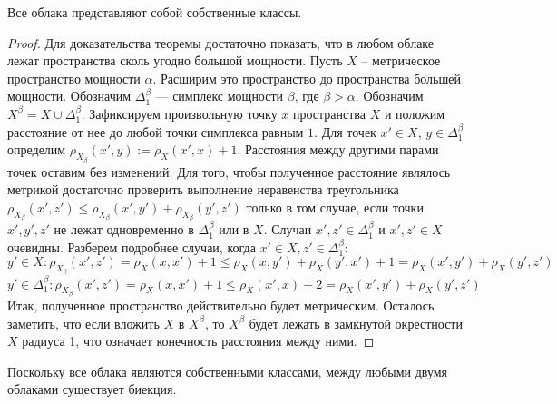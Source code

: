 	\begin{theorem}
		Все облака представляют собой собственные классы.
	\end{theorem}
	\begin{proof}
		Для доказательства теоремы достаточно показать, что в любом облаке лежат пространства сколь угодно большой мощности.
		Пусть $X$ -- метрическое пространство мощности $\alpha$. Расширим это пространство до пространства большей мощности. Обозначим $\Delta^\beta_1$ --- симплекс мощности $\beta$, где $\beta > \alpha$. Обозначим $X^\beta = X \cup \Delta^\beta_1$. Зафиксируем произвольную точку $x$ пространства $X$ и положим расстояние от нее до любой точки симплекса равным $1$. Для точек $x' \in X$, $y \in \Delta^\beta_1$ определим $\rho_{X_\beta}(x',y) := \rho_X(x',x) + 1$. Расстояния между другими парами точек оставим без изменений. Для того, чтобы полученное расстояние являлось метрикой достаточно проверить выполнение неравенства треугольника $\rho_{X_\beta}(x',z') \le \rho_{X_\beta}(x',y') +\rho_{X_\beta}(y',z')$  
		только в том случае, если точки $x', y', z'$ не лежат одновременно в $\Delta^\beta_1$ или в $X$. Случаи $x', z' \in \Delta^\beta_1$ и $ x', z' \in X$ очевидны. Разберем подробнее случаи, когда $x' \in X, z' \in \Delta^\beta_1$:
		$$ y' \in X: \rho_{X_\beta}(x', z') = \rho_X(x,x') + 1 \le \rho_X(x,y') + \rho_X(y',x') + 1 = \rho_X(x',y') + \rho_X(y',z')$$
		$$y' \in \Delta^\beta_1: \rho_{X_\beta}(x', z') = \rho_X(x,x') + 1 \le \rho_X(x',x) + 2 = \rho_X(x',y') + \rho_X(y',z')$$
		Итак, полученное пространство действительно будет метрическим. Осталось заметить, что если вложить $X$ в $X^\beta$, то $X^\beta$ будет лежать в замкнутой окрестности $X$ радиуса 1, что означает конечность расстояния между ними.
 	 \end{proof}
 	 
 	 \begin{remark}
 	 	Поскольку все облака являются собственными классами, между любыми двумя облаками существует биекция.
 	 \end{remark}
 	 
 	 
